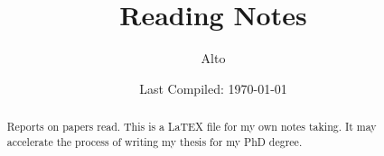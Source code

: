 \documentclass[12pt]{report}
\begin{document}
\title{{\selectfont Reading Notes}}

\author{
    Alto
}

\date{Last Compiled: \today}

\maketitle

\begin{abstract} 
    Reports on papers read. 
    This is a LaTEX file for my own notes taking. 
    It may accelerate the process of writing my thesis for my PhD degree. 
\end{abstract}
\end{document}
